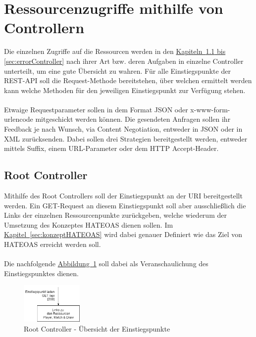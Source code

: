 \section{Ressourcenzugriffe mithilfe von Controllern}
Die einzelnen Zugriffe auf die Ressourcen werden in den \hyperref[sec:rootController, sec:errorController]{Kapiteln~\ref{sec:rootController} bis \ref{sec:errorController}} nach ihrer Art bzw. deren Aufgaben in einzelne Controller unterteilt, um eine gute Übersicht zu wahren. Für alle Einstiegspunkte der \gls{REST}-\gls{API} soll die Request-Methode  bereitstehen, über welchen ermittelt werden kann welche Methoden für den jeweiligen Einstiegspunkt zur Verfügung stehen.\\
\\
Etwaige Requestparameter sollen in dem Format \gls{JSON} oder x-www-form-urlencode mitgeschickt werden können. Die gesendeten Anfragen sollen ihr Feedback je nach Wunsch, via Content Negotiation, entweder in \gls{JSON} oder in \gls{XML} zurücksenden. Dabei sollen drei Strategien bereitgestellt werden, entweder mittels Suffix, einem URL-Parameter oder dem \gls{HTTP} Accept-Header. 

\subsection{Root Controller}\label{sec:rootController}
Mithilfe des Root Controllers soll der Einstiegspunkt an der \gls{URI}  bereitgestellt werden. Ein GET-Request an diesem Einstiegspunkt soll aber ausschließlich die Links der einzelnen Ressourcenpunkte zurückgeben, welche wiederum der Umsetzung des Konzeptes HATEOAS dienen sollen. Im \hyperref[sec:konzeptHATEOAS]{Kapitel~\ref{sec:konzeptHATEOAS}} wird dabei genauer Definiert wie das Ziel von HATEOAS erreicht werden soll.\\
\\
Die nachfolgende \hyperref[fig:rootController]{Abbildung~\ref{fig:rootController}} soll dabei als Veranschaulichung des Einstiegspunktes dienen.
\begin{figure}[htb]
	\includegraphics[width=0.266\textwidth]{images/root-controller.png}
	\caption{Root Controller - Übersicht der Einstiegspunkte}
	\label{fig:rootController}
\end{figure}

